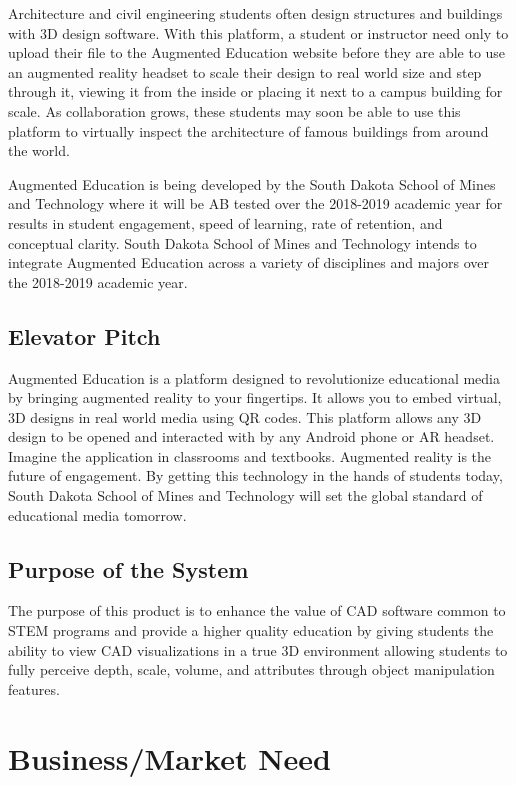 Architecture and civil engineering students often design structures and buildings with 3D design software. With this platform, a student or instructor need only to upload their file to the Augmented Education website before they are able to use an augmented reality headset to scale their design to real world size and step through it, viewing it from the inside or placing it next to a campus building for scale. As collaboration grows, these students may soon be able to use this platform to virtually inspect the architecture of famous buildings from around the world. 

Augmented Education is being developed by the South Dakota School of Mines and Technology where it will be AB tested over the 2018-2019 academic year for results in student engagement, speed of learning, rate of retention, and conceptual clarity. South Dakota School of Mines and Technology intends to integrate Augmented Education across a variety of disciplines and majors over the 2018-2019 academic year.

\subsection{Elevator Pitch}
Augmented Education is a platform designed to revolutionize educational media by bringing augmented reality to your fingertips. It allows you to embed virtual, 3D designs in real world media using QR codes. This platform allows any 3D design to be opened and interacted with by any Android phone or AR headset. Imagine the application in classrooms and textbooks. Augmented reality is the future of engagement. By getting this technology in the hands of students today, South Dakota School of Mines and Technology will set the global standard of educational media tomorrow. 

\subsection{Purpose of the System}

The purpose of this product is to enhance the value of CAD software common to STEM programs and provide a higher quality education by giving students the ability to view CAD visualizations in a true 3D environment allowing students to fully perceive depth, scale, volume, and attributes through object manipulation features.


\section{Business/Market Need}


